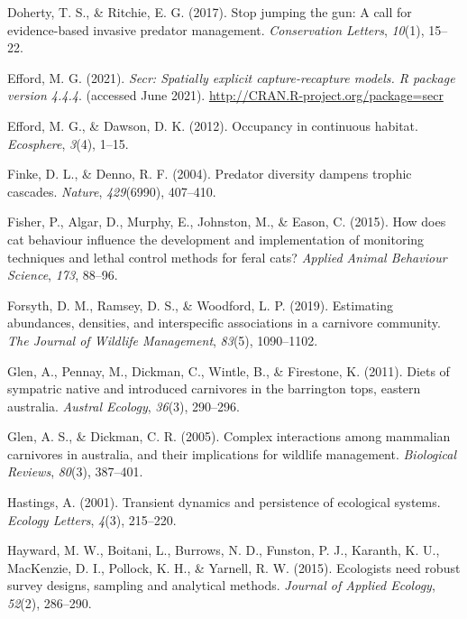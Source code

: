\documentclass[]{elsarticle} %
\begin{document}
\leavevmode\hypertarget{ref-doherty2017}{}%
Doherty, T. S., \& Ritchie, E. G. (2017). Stop jumping the gun: A call for evidence-based invasive predator management. \emph{Conservation Letters}, \emph{10}(1), 15--22.

\leavevmode\hypertarget{ref-efford2021secr}{}%
Efford, M. G. (2021). \emph{Secr: Spatially explicit capture-recapture models. R package version 4.4.4}. (accessed June 2021). \url{http://CRAN.R-project.org/package=secr}

\leavevmode\hypertarget{ref-efford2012}{}%
Efford, M. G., \& Dawson, D. K. (2012). Occupancy in continuous habitat. \emph{Ecosphere}, \emph{3}(4), 1--15.

\leavevmode\hypertarget{ref-finke2004}{}%
Finke, D. L., \& Denno, R. F. (2004). Predator diversity dampens trophic cascades. \emph{Nature}, \emph{429}(6990), 407--410.

\leavevmode\hypertarget{ref-fisher2015}{}%
Fisher, P., Algar, D., Murphy, E., Johnston, M., \& Eason, C. (2015). How does cat behaviour influence the development and implementation of monitoring techniques and lethal control methods for feral cats? \emph{Applied Animal Behaviour Science}, \emph{173}, 88--96.

\leavevmode\hypertarget{ref-forsyth2019}{}%
Forsyth, D. M., Ramsey, D. S., \& Woodford, L. P. (2019). Estimating abundances, densities, and interspecific associations in a carnivore community. \emph{The Journal of Wildlife Management}, \emph{83}(5), 1090--1102.

\leavevmode\hypertarget{ref-glen2011}{}%
Glen, A., Pennay, M., Dickman, C., Wintle, B., \& Firestone, K. (2011). Diets of sympatric native and introduced carnivores in the barrington tops, eastern australia. \emph{Austral Ecology}, \emph{36}(3), 290--296.

\leavevmode\hypertarget{ref-glen2005}{}%
Glen, A. S., \& Dickman, C. R. (2005). Complex interactions among mammalian carnivores in australia, and their implications for wildlife management. \emph{Biological Reviews}, \emph{80}(3), 387--401.

\leavevmode\hypertarget{ref-hastings2001}{}%
Hastings, A. (2001). Transient dynamics and persistence of ecological systems. \emph{Ecology Letters}, \emph{4}(3), 215--220.

\leavevmode\hypertarget{ref-hayward2015}{}%
Hayward, M. W., Boitani, L., Burrows, N. D., Funston, P. J., Karanth, K. U., MacKenzie, D. I., Pollock, K. H., \& Yarnell, R. W. (2015). Ecologists need robust survey designs, sampling and analytical methods. \emph{Journal of Applied Ecology}, \emph{52}(2), 286--290.
\end{document}
